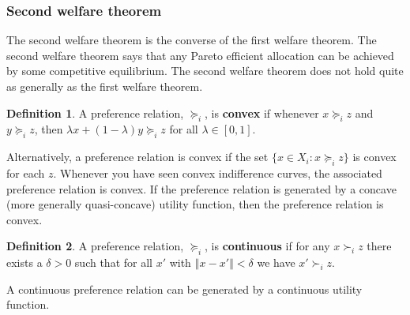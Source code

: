 \documentclass[12pt,reqno]{amsart}
\theoremstyle{definition}
\newtheorem{definition}{Definition}[section]
\newcommand{\norm}[1]{\left\Vert {#1} \right\Vert}
\newcommand{\prefeq}{\succeq}
\newcommand{\pref}{\succ}
\begin{document}
\subsubsection{Second welfare theorem}
The second welfare theorem is the converse of the first welfare
theorem. The second welfare theorem says that any Pareto efficient
allocation can be achieved by some competitive equilibrium. The second
welfare theorem does not hold quite as generally as the first welfare
theorem. 
\begin{definition}
  A preference relation, $\prefeq_i$, is \textbf{convex} if whenever $x
  \prefeq_i z$ and $y \prefeq_i z$, then $\lambda x + (1-\lambda) y
  \prefeq_i z$ for all $\lambda \in [0,1]$. 
\end{definition}
Alternatively, a preference relation is convex if the set $\{x\in X_i: x
\prefeq_i z\}$ is convex for each $z$. Whenever you have seen convex
indifference curves, the associated preference relation is convex. If
the preference relation is generated by a concave (more generally
quasi-concave) utility function, then the preference relation is
convex.
\begin{definition}
  A preference relation, $\prefeq_i$, is \textbf{continuous} if
  for any  $x \pref_i z$ there exists a $\delta >
  0$ such that for all $x'$ with $\norm{x - x'}<\delta$ we have $x'
  \pref_i z$.
\end{definition}
A continuous preference relation can be generated by a continuous
utility function.
\end{document}

